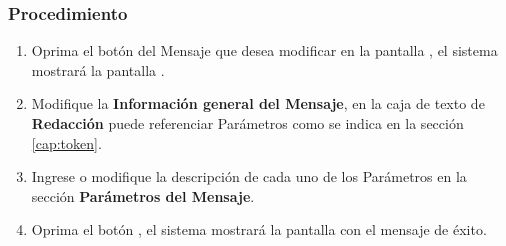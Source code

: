 	
\subsubsection{Procedimiento}
\begin{enumerate}
	\item Oprima el botón \btnEditar del Mensaje que desea modificar en la pantalla , el sistema mostrará la pantalla . 

	
	\item Modifique la \textbf{Información general del Mensaje}, en la caja de texto de {\bf Redacción} puede referenciar Parámetros como se indica en la sección \ref{cap:token}.
	
	\item Ingrese o modifique la descripción de cada uno de los Parámetros en la sección \textbf{Parámetros del Mensaje}.
	
	\item Oprima el botón , el sistema mostrará la pantalla  con el mensaje de éxito.
\end{enumerate}


